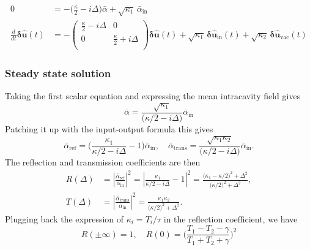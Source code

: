  \begin{equation}
  \begin{split}
  0 &= -\Big(\frac{\kappa}{2}-i\Delta\Big) \bar{\alpha} + \sqrt{\kappa_1} \, \bar{\alpha}_{\mathrm{in}} \\
  \frac{d}{dt} \mathbf{\delta \hat{u}}(t)&= - \begin{pmatrix}
  \frac{\kappa}{2}-i\Delta & 0 \\ 
  0 & \frac{\kappa}{2}+i\Delta \\ 
  \end{pmatrix}  \mathbf{\delta \hat{u}}(t) + \sqrt{\kappa_{\mathrm{1}}} \, \mathbf{\delta \hat{u}_{\mathrm{in}}}(t)  + \sqrt{\kappa_2} \, \mathbf{\delta \hat{u}_{\mathrm{vac}}}(t)
  \end{split}
\end{equation}

\subsubsection{Steady state solution}
Taking the first scalar equation and expressing the mean intracavity field gives 
\begin{equation}
  \bar{\alpha} =  \frac{\sqrt{\kappa_1}}{\Big(\kappa/2-i\Delta\Big)}  \bar{\alpha}_{\mathrm{in}} 
\end{equation}
Patching it up with the input-output formula this gives 
\begin{equation}
  \bar{\alpha}_{\mathrm{ref}} =  \Bigg( \frac{\kappa_1}{\kappa/2-i\Delta} - 1 \Bigg)  \bar{\alpha}_{\mathrm{in}}  , \quad   \bar{\alpha}_{\mathrm{trans}} =  \frac{\sqrt{\kappa_1 \kappa_2}}{\Big(\kappa/2-i\Delta\Big)} \bar{\alpha}_{\mathrm{in}}.
\end{equation}
The reflection and transmission coefficients are then
\begin{align}
R(\Delta) &= \left|\frac{\bar{\alpha}_{\mathrm{ref}}}{\bar{\alpha}_{\mathrm{in}}}\right|^2
= \left| \frac{\kappa_1}{\kappa/2 - i\Delta} -1 \right|^2
= \frac{\bigl(\kappa_1-\kappa/2\bigr)^2+\Delta^2}{\bigl(\kappa/2)^2+\Delta^2},\\[10pt]
T(\Delta) &= \left|\frac{\bar{\alpha}_{\mathrm{trans}}}{\bar{\alpha}_{\mathrm{in}}}\right|^2
= \frac{\kappa_1\kappa_2}{\bigl(\kappa/2\bigr)^2+\Delta^2}.
\end{align}
Plugging back the expression of $\kappa_i = T_i/\tau$ in the reflection coefficient, we have 
\begin{equation}
  R(\pm\infty) = 1 , \quad R(0) = \Bigg(\frac{T_1 - T_2 - \gamma}{T_1 + T_2 + \gamma}\Bigg)^2
\end{equation}

